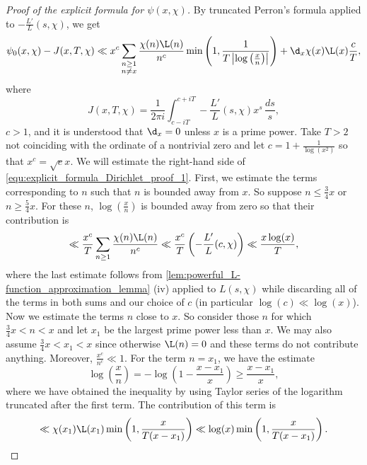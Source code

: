     \begin{proof}[Proof of the explicit formula for $\psi(x,\chi)$]
      By truncated Perron's formula applied to $-\frac{L'}{L}(s,\chi)$, we get
      \begin{equation}\label{equ:explicit_formula_Dirichlet_proof_1}
        \psi_{0}(x,\chi)-J(x,T,\chi) \ll x^{c}\sum_{\substack{n \ge 1 \\ n \neq x}}\frac{\chi(n)\L(n)}{n^{c}}\min\left(1,\frac{1}{T\left|\log\left(\frac{x}{n}\right)\right|}\right)+\d_{x}\chi(x)\L(x)\frac{c}{T},
      \end{equation}
      where
      \[
        J(x,T,\chi) = \frac{1}{2\pi i}\int_{c-iT}^{c+iT}-\frac{L'}{L}(s,\chi)x^{s}\,\frac{ds}{s},
      \]
      $c > 1$, and it is understood that $\d_{x} = 0$ unless $x$ is a prime power. Take $T > 2$ not coinciding with the ordinate of a nontrivial zero and let $c = 1+\frac{1}{\log(x^{2})}$ so that $x^{c} = \sqrt{e}x$. We will estimate the right-hand side of \cref{equ:explicit_formula_Dirichlet_proof_1}. First, we estimate the terms corresponding to $n$ such that $n$ is bounded away from $x$. So suppose $n \le \frac{3}{4}x$ or $n \ge \frac{5}{4}x$. For these $n$, $\log\left(\frac{x}{n}\right)$ is bounded away from zero so that their contribution is
      \begin{equation}\label{equ:explicit_formula_Dirichlet_proof_2}
        \ll \frac{x^{c}}{T}\sum_{n \ge 1}\frac{\chi(n)\L(n)}{n^{c}} \ll \frac{x^{c}}{T}\left(-\frac{L'}{L}(c,\chi)\right) \ll \frac{x\log(x)}{T},
      \end{equation}
      where the last estimate follows from \cref{lem:powerful_L-function_approximation_lemma} (iv) applied to $L(s,\chi)$ while discarding all of the terms in both sums and our choice of $c$ (in particular $\log(c) \ll \log(x)$). Now we estimate the terms $n$ close to $x$. So consider those $n$ for which $\frac{3}{4}x < n < x$ and let $x_{1}$ be the largest prime power less than $x$. We may also assume $\frac{3}{4}x < x_{1} < x$ since otherwise $\L(n) = 0$ and these terms do not contribute anything. Moreover, $\frac{x^{c}}{n^{c}} \ll 1$. For the term $n = x_{1}$, we have the estimate
      \[
        \log\left(\frac{x}{n}\right) = -\log\left(1-\frac{x-x_{1}}{x}\right) \ge \frac{x-x_{1}}{x},
      \]
      where we have obtained the inequality by using Taylor series of the logarithm truncated after the first term. The contribution of this term is
      \begin{equation}\label{equ:explicit_formula_Dirichlet_proof_3}
        \ll \chi(x_{1})\L(x_{1})\min\left(1,\frac{x}{T(x-x_{1})}\right) \ll \log(x)\min\left(1,\frac{x}{T(x-x_{1})}\right).

\end{equation}
\end{proof}
